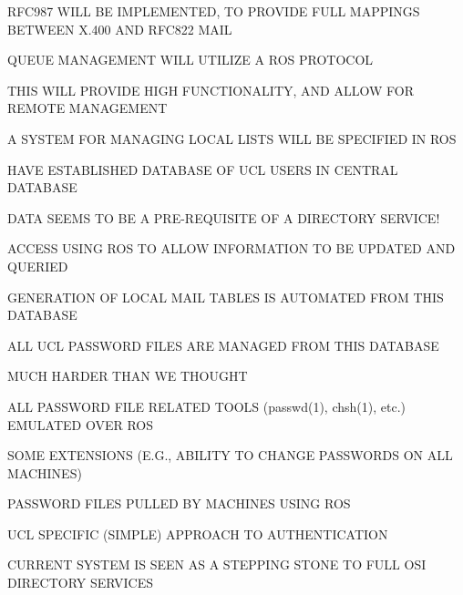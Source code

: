 \begin{bwslide}

\begin{nrtc}
\item	RFC987 WILL BE IMPLEMENTED, TO PROVIDE FULL MAPPINGS
	BETWEEN X.400 AND RFC822 MAIL

\item	QUEUE MANAGEMENT WILL UTILIZE A ROS PROTOCOL
    \begin{nrtc}
    \item	THIS WILL PROVIDE HIGH FUNCTIONALITY, AND ALLOW FOR REMOTE
		MANAGEMENT
    \end{nrtc}

\item	A SYSTEM FOR MANAGING LOCAL LISTS WILL BE SPECIFIED IN ROS
\end{nrtc}
\end{bwslide}


\begin{bwslide}

\begin{nrtc}
\item	HAVE ESTABLISHED DATABASE OF UCL USERS IN CENTRAL DATABASE
    \begin{nrtc}
    \item	DATA SEEMS TO BE A PRE-REQUISITE OF A DIRECTORY SERVICE!
    \end{nrtc}

\item	ACCESS USING ROS TO ALLOW INFORMATION TO BE UPDATED AND QUERIED

\item	GENERATION OF LOCAL MAIL TABLES IS AUTOMATED FROM THIS DATABASE

\item	ALL UCL PASSWORD FILES ARE MANAGED FROM THIS DATABASE
  \begin{nrtc}\small
    \item	MUCH HARDER THAN WE THOUGHT

    \item	ALL PASSWORD FILE RELATED TOOLS (passwd(1), chsh(1), etc.)
		EMULATED OVER ROS

    \item	SOME EXTENSIONS
		(E.G., ABILITY TO CHANGE PASSWORDS ON ALL MACHINES)

    \item	PASSWORD FILES PULLED BY MACHINES USING ROS

    \item	UCL SPECIFIC (SIMPLE) APPROACH TO AUTHENTICATION
    \end{nrtc}

\item	CURRENT SYSTEM IS SEEN AS A STEPPING STONE TO FULL OSI
	DIRECTORY SERVICES
\end{nrtc}
\end{bwslide}



